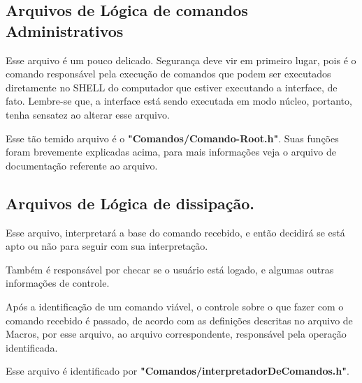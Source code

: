 \documentclass[onecolumn,12pt]{article}
\begin{document}
			\subsection{Arquivos de Lógica de comandos Administrativos}
				Esse arquivo é um pouco delicado. Segurança deve vir em primeiro lugar, pois é o comando responsável pela execução de comandos que podem ser executados diretamente no SHELL do computador que estiver executando a interface, de fato. Lembre-se que, a interface está sendo executada em modo núcleo, portanto, tenha sensatez ao alterar esse arquivo.\par
				Esse tão temido arquivo é o \textbf{"Comandos/Comando-Root.h"}. Suas funções foram brevemente explicadas acima, para mais informações veja o arquivo de documentação referente ao arquivo.

			\subsection{Arquivos de Lógica de dissipação.}
				Esse arquivo, interpretará a base do comando recebido, e então decidirá se está apto ou não para seguir com sua interpretação.\par
				Também é responsável por checar se o usuário está logado, e algumas outras informações de controle.\par
				Após a identificação de um comando viável, o controle sobre o que fazer com o comando recebido é passado, de acordo com as definições descritas no arquivo de Macros, por esse arquivo, ao arquivo correspondente, responsável pela operação identificada.\par
				Esse arquivo é identificado por \textbf{"Comandos/interpretadorDeComandos.h"}.
\end{document}
